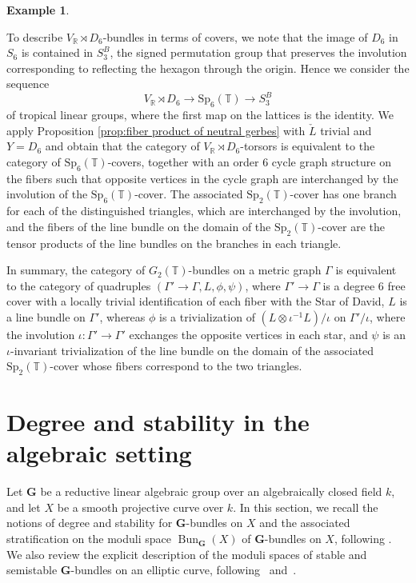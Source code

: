 \documentclass[10pt, a4paper]{amsart}
\theoremstyle{definition}
\newtheorem{example}[theorem]{Example}
\theoremstyle{myitemstyle}
\newcommand{\RR}{\mathbb{R}}
\newcommand{\TT}{\mathbb{T}}
\newcommand{\bfG}{\mathbf{G}}
\DeclareMathOperator{\Bun}{Bun}
\newcommand{\Sp}{{\mathrm{Sp}}}
\newcommand{\Ga}{\Gamma}
\begin{document}
\begin{example}
\begin{itemize}
        To describe $V_{\RR}\rtimes D_6$-bundles in terms of covers, we note that the image of $D_6$ in $S_6$ is contained in $S_3^B$, the signed permutation group that preserves the involution corresponding to reflecting the hexagon through the origin. Hence we consider the sequence
        \[
        V_{\RR}\rtimes D_6 \to \Sp_6(\TT) \to S^B_3
        \]
        of tropical linear groups, where the first map on the lattices is the identity. We apply Proposition \ref{prop:fiber product of neutral gerbes} with $\check{L}$ trivial and $Y=D_6$ and obtain that the category of $V_{\RR}\rtimes D_6$-torsors is equivalent to the category of $\Sp_6(\TT)$-covers, together with an order $6$ cycle graph structure on the fibers such that opposite vertices in the cycle graph are interchanged by the involution of the $\Sp_6(\TT)$-cover. The associated $\Sp_2(\TT)$-cover has one branch for each of the distinguished triangles, which are interchanged by the involution, and the fibers of the line bundle on the domain of the $\Sp_2(\TT)$-cover are the tensor products of the line bundles on the branches in each triangle.

        In summary, the category of $G_2(\TT)$-bundles on a metric graph $\Ga$ is equivalent to the category of quadruples $(\Gamma'\to \Gamma, L, \phi,\psi )$, where $\Gamma'\to \Gamma$ is a degree $6$ free cover with a locally trivial identification of each fiber with the Star of David, $L$ is a line bundle on $\Gamma'$, whereas $\phi$ is a trivialization of $(L\otimes \iota^{-1}L)/\iota$ on $\Gamma'/\iota$, where the involution $\iota:\Ga'\to \Ga'$ exchanges the opposite vertices in each star, and $\psi$ is an $\iota$-invariant trivialization of the line bundle on the domain of the associated $\Sp_2(\TT)$-cover whose fibers correspond to the two triangles.
    \end{itemize}
    
\end{example}










\section{Degree and stability in the algebraic setting}
\label{sec:Degree and stability in the algebraic setting}


Let $\bfG$ be a reductive linear algebraic group over an algebraically closed field $k$, and let $X$ be a smooth projective curve over $k$. In this section, we recall the notions of degree and stability for $\bfG$-bundles on $X$ and the associated stratification on the moduli space $\Bun_\bfG(X)$ of $\bfG$-bundles on $X$, following  \cite{schieder2015harder}. We also review the explicit description of the moduli spaces of stable and semistable $\bfG$-bundles on an elliptic curve, following~\cite{fratila2016stack} and~\cite{Fratila_revisitingelliptic}.
\end{document}
